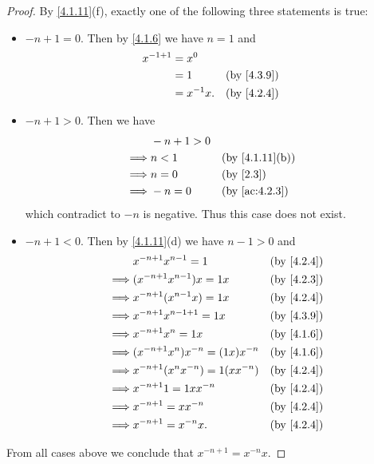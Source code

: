 \begin{proof}
  By \cref{4.1.11}(f), exactly one of the following three statements is true:
  \begin{itemize}
    \item \(-n + 1 = 0\).
          Then by \cref{4.1.6} we have \(n = 1\) and
          \begin{align*}
            x^{-1 + 1} & = x^0                                     \\
                       & = 1         &  & \text{(by \cref{4.3.9})} \\
                       & = x^{-1} x. &  & \text{(by \cref{4.2.4})}
          \end{align*}
    \item \(-n + 1 > 0\).
          Then we have
          \begin{align*}
                     & -n + 1 > 0                                   \\
            \implies & n < 1      &  & \text{(by \cref{4.1.11}(b))} \\
            \implies & n = 0      &  & \text{(by \cref{2.3})}       \\
            \implies & -n = 0     &  & \text{(by \cref{ac:4.2.3})}
          \end{align*}
          which contradict to \(-n\) is negative.
          Thus this case does not exist.
    \item \(-n + 1 < 0\).
          Then by \cref{4.1.11}(d) we have \(n - 1 > 0\) and
          \begin{align*}
                     & x^{-n + 1} x^{n - 1} = 1              &  & \text{(by \cref{4.2.4})} \\
            \implies & (x^{-n + 1} x^{n - 1}) x = 1x         &  & \text{(by \cref{4.2.3})} \\
            \implies & x^{-n + 1} (x^{n - 1} x) = 1x         &  & \text{(by \cref{4.2.4})} \\
            \implies & x^{-n + 1} x^{n - 1 + 1} = 1x         &  & \text{(by \cref{4.3.9})} \\
            \implies & x^{-n + 1} x^n = 1x                   &  & \text{(by \cref{4.1.6})} \\
            \implies & (x^{-n + 1} x^n) x^{-n} = (1x) x^{-n} &  & \text{(by \cref{4.1.6})} \\
            \implies & x^{-n + 1} (x^n x^{-n}) = 1(x x^{-n}) &  & \text{(by \cref{4.2.4})} \\
            \implies & x^{-n + 1} 1 = 1x x^{-n}              &  & \text{(by \cref{4.2.4})} \\
            \implies & x^{-n + 1} = x x^{-n}                 &  & \text{(by \cref{4.2.4})} \\
            \implies & x^{-n + 1} = x^{-n} x.                &  & \text{(by \cref{4.2.4})}
          \end{align*}
  \end{itemize}
  From all cases above we conclude that \(x^{-n + 1} = x^{-n} x\).
\end{proof}

